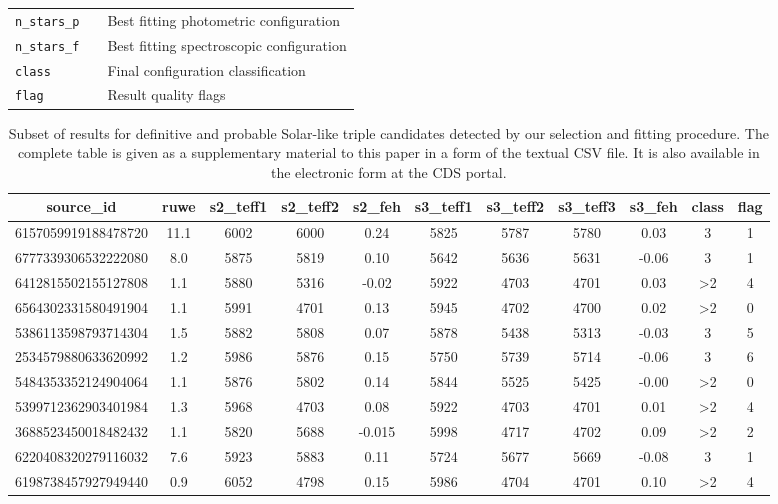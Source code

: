 \begin{table}
\begin{tabular}{l c l}
		\texttt{n\_stars\_p} & & Best fitting photometric configuration \\
		\texttt{n\_stars\_f} & & Best fitting spectroscopic configuration\\
		
		\texttt{class} & & Final configuration classification \\
		\texttt{flag} & & Result quality flags \\
		\hline
	\end{tabular}
\end{table}

\begin{table}
	\centering
	\caption{Subset of results for definitive and probable Solar-like triple candidates detected by our selection and fitting procedure. The complete table is given as a supplementary material to this paper in a form of the textual CSV file. It is also available in the electronic form at the CDS portal.}
	\label{tab:out_triple}
	\begin{tabular}{ccccccccccc}
		\hline
		source\_id & ruwe & s2\_teff1 & s2\_teff2 & s2\_feh & s3\_teff1 & s3\_teff2 & s3\_teff3 & s3\_feh & class & flag \\
		\hline
		6157059919188478720 & 11.1 & 6002 & 6000 & 0.24 & 5825 & 5787 & 5780 & 0.03 & 3 & 1 \\
		6777339306532222080 & 8.0 & 5875 & 5819 & 0.10 & 5642 & 5636 & 5631 & -0.06 & 3 & 1 \\
		6412815502155127808 & 1.1 & 5880 & 5316 & -0.02 & 5922 & 4703 & 4701 & 0.03 & >2 & 4 \\
		6564302331580491904 & 1.1 & 5991 & 4701 & 0.13 & 5945 & 4702 & 4700 & 0.02 & >2 & 0 \\
		5386113598793714304 & 1.5 & 5882 & 5808 & 0.07 & 5878 & 5438 & 5313 & -0.03 & 3 & 5 \\
		2534579880633620992 & 1.2 & 5986 & 5876 & 0.15 & 5750 & 5739 & 5714 & -0.06 & 3 & 6 \\
		5484353352124904064 & 1.1 & 5876 & 5802 & 0.14 & 5844 & 5525 & 5425 & -0.00 & >2 & 0 \\
		5399712362903401984 & 1.3 & 5968 & 4703 & 0.08 & 5922 & 4703 & 4701 & 0.01 & >2 & 4 \\
		3688523450018482432 & 1.1 & 5820 & 5688 & -0.015 & 5998 & 4717 & 4702 & 0.09 & >2 & 2 \\
		6220408320279116032 & 7.6 & 5923 & 5883 & 0.11 & 5724 & 5677 & 5669 & -0.08 & 3 & 1 \\
		6198738457927949440 & 0.9 & 6052 & 4798 & 0.15 & 5986 & 4704 & 4701 & 0.10 & >2 & 4 \\

\end{tabular}
\end{table}
